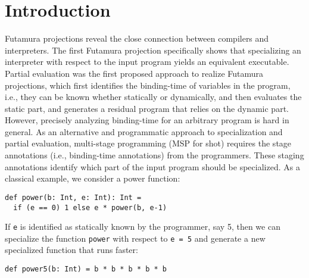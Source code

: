\section{Introduction}


Futamura projections \cite{Futamura1999, futamura1971partial} reveal the close connection between 
compilers and interpreters. 
The first Futamura projection specifically shows that specializing an interpreter with respect to 
the input program yields an equivalent executable.
Partial evaluation \cite{DBLP:books/daglib/0072559} was the first proposed approach to realize 
Futamura projections, which first identifies the binding-time of variables in the program, i.e., 
they can be known whether statically or dynamically, and then evaluates the static part, and 
generates a residual program that relies on the dynamic part.
However, precisely analyzing binding-time for an arbitrary program is hard in general. As an 
alternative and programmatic approach to specialization and partial evaluation, multi-stage 
programming (MSP for shot) \cite{taha1999multi, DBLP:conf/pepm/TahaS97} requires the stage 
annotations (i.e., binding-time annotations) from the programmers. These staging annotations 
identify which part of the input program should be specialized.
As a classical example, we consider a power function: 
\begin{lstlisting}
def power(b: Int, e: Int): Int = 
  if (e == 0) 1 else e * power(b, e-1)
\end{lstlisting}
If \texttt{e} is identified as statically known by the programmer, say 5, then we can 
specialize the function \texttt{power} with respect to \texttt{e = 5} and generate a new 
specialized function that runs faster:
\begin{lstlisting}
def power5(b: Int) = b * b * b * b * b
\end{lstlisting}

